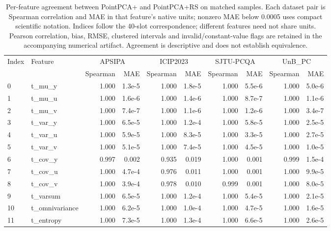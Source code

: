 \documentclass[final,3p,times,twocolumn]{elsarticle}
\begin{document}
\begin{table}[t!]
    \centering
    \caption{Per-feature agreement between PointPCA+ and PointPCA+RS on matched samples. Each dataset pair is Spearman correlation and MAE in that feature's native units; nonzero \gls{MAE} below 0.0005 uses compact scientific notation. Indices follow the 40-slot correspondence; different features need not share units. Pearson correlation, bias, \gls{RMSE}, clustered intervals and invalid/constant-value flags are retained in the accompanying numerical artifact. Agreement is descriptive and does not establish equivalence.}
    \label{tab_review_feature_agreement}
    \scriptsize
    \begin{adjustbox}{max width=\textwidth}
    \begin{tabular}{llrrrrrrrr}
    \toprule
    Index & Feature & \multicolumn{2}{c}{APSIPA} & \multicolumn{2}{c}{ICIP2023} & \multicolumn{2}{c}{SJTU-PCQA} & \multicolumn{2}{c}{UnB\_PC} \\
    & & Spearman & MAE & Spearman & MAE & Spearman & MAE & Spearman & MAE \\
    \midrule
    0 & t\_mu\_y & 1.000 & 1.3e-5 & 1.000 & 1.8e-5 & 1.000 & 5.5e-6 & 1.000 & 5.0e-6 \\
    1 & t\_mu\_u & 1.000 & 1.6e-6 & 1.000 & 1.4e-6 & 1.000 & 8.7e-7 & 1.000 & 1.1e-6 \\
    2 & t\_mu\_v & 1.000 & 7.4e-7 & 1.000 & 1.1e-6 & 1.000 & 1.2e-6 & 1.000 & 3.4e-7 \\
    3 & t\_var\_y & 1.000 & 6.5e-5 & 1.000 & 1.2e-4 & 1.000 & 5.8e-5 & 1.000 & 2.5e-5 \\
    4 & t\_var\_u & 1.000 & 5.9e-5 & 1.000 & 8.3e-5 & 1.000 & 3.3e-5 & 1.000 & 2.7e-5 \\
    5 & t\_var\_v & 1.000 & 5.1e-5 & 1.000 & 7.4e-5 & 1.000 & 4.5e-5 & 1.000 & 1.0e-5 \\
    6 & t\_cov\_y & 0.997 & 0.002 & 0.935 & 0.019 & 1.000 & 0.001 & 0.999 & 1.5e-4 \\
    7 & t\_cov\_u & 1.000 & 4.7e-4 & 0.976 & 0.011 & 1.000 & 0.001 & 1.000 & 9.9e-5 \\
    8 & t\_cov\_v & 1.000 & 3.9e-4 & 0.978 & 0.010 & 0.999 & 0.001 & 1.000 & 8.0e-5 \\
    9 & t\_varsum & 1.000 & 6.5e-5 & 1.000 & 1.2e-4 & 1.000 & 5.4e-5 & 1.000 & 2.1e-5 \\
    10 & t\_omnivariance & 1.000 & 6.2e-5 & 1.000 & 1.0e-4 & 1.000 & 4.7e-5 & 1.000 & 1.6e-5 \\
    11 & t\_entropy & 1.000 & 7.3e-5 & 1.000 & 1.3e-4 & 1.000 & 6.6e-5 & 1.000 & 2.6e-5 \\

\end{tabular}
\end{adjustbox}
\end{table}
\end{document}
